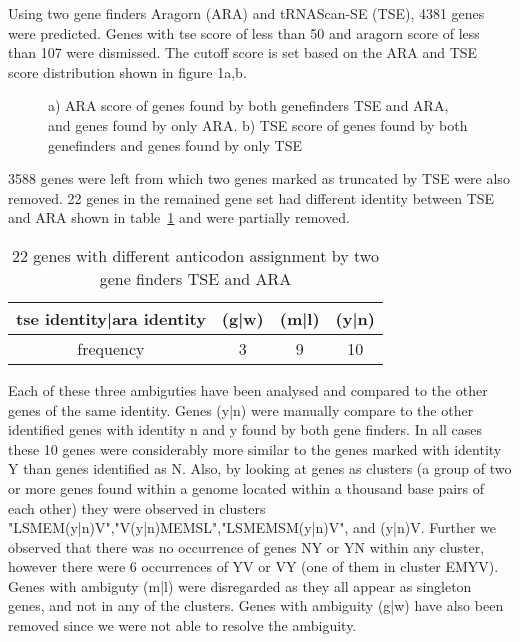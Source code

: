 \documentclass[table,
12pt, %
a4paper, %
oneside, %
headinclude,footinclude, %
BCOR5mm, %
]{scrartcl}
\begin{document}
Using two gene finders Aragorn (ARA) and tRNAScan-SE (TSE), 4381 genes were predicted. Genes with tse score of less than 50 and aragorn score of less than 107 were dismissed. The cutoff score is set based on the ARA and TSE score distribution shown in figure 1a,b. 

\begin{figure}[H]%
    \centering
    \caption{a) ARA score of genes found by both genefinders TSE and ARA, and genes found by only ARA. b) TSE score of genes found by both genefinders and genes found by only TSE}%
    \label{fig:example}%
\end{figure}

3588 genes were left from which two genes marked as truncated by TSE were also removed. 22 genes in the remained gene set had different identity between TSE and ARA shown in table~\ref{table:2} and were partially removed.
\begin{table}[hbt]
\caption{22 genes with different anticodon assignment by two gene finders TSE and ARA}
\begin{adjustbox}{width=7cm,center}
\begin{tabular}{|c|ccc|}
\hline
tse identity|ara identity & (g|w) & (m|l) & (y|n)\\
\hline
frequency & 3 & 9 & 10\\
\hline
\end{tabular}
\label{table:2}
\end{adjustbox}
\end{table}

Each of these three ambiguties have been analysed and compared to the other genes of the same identity. Genes (y|n) were manually compare to the other identified genes with identity n and y found by both gene finders. In all cases these 10 genes were considerably more similar to the genes marked with identity Y than genes identified as N. Also, by looking at genes as clusters (a group of two or more genes found within a genome located within a thousand base pairs of each other) they were observed in clusters "LSMEM(y|n)V","V(y|n)MEMSL","LSMEMSM(y|n)V", and (y|n)V. Further we observed that there was no occurrence of genes NY or YN within any cluster, however there were 6 occurrences of YV or VY (one of them in cluster EMYV). Genes with ambiguty (m|l) were disregarded as they all appear as singleton genes, and not in any of the clusters. Genes with ambiguity (g|w) have also been removed since we were not able to resolve the ambiguity.
\end{document}
